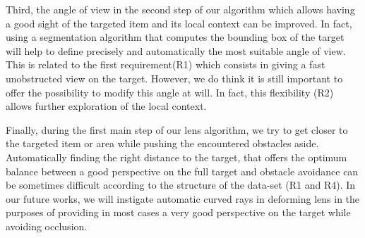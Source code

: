 Third, the angle of view in the second step of our algorithm which allows having a good sight of the targeted item and its local context can be improved. In fact, using a segmentation algorithm that computes the bounding box of the target will help to define precisely and automatically the most suitable angle of view. This is related to the first requirement(R1) which consists in giving a fast unobstructed view on the target. However, we do think it is still important to offer the possibility to modify this angle at will. In fact, this flexibility (R2) allows further exploration of the local context.

Finally, during the first main step of our lens algorithm, we try to get closer to the targeted item or area while pushing the encountered obstacles aside. Automatically finding the right distance to the target, that offers the optimum balance between a good perspective on the full target and obstacle avoidance can be sometimes difficult according to the structure of the data-set (R1 and R4). In our future works, we will instigate automatic curved rays in deforming lens in the purposes of providing in most cases a very good perspective on the target while avoiding occlusion. 

